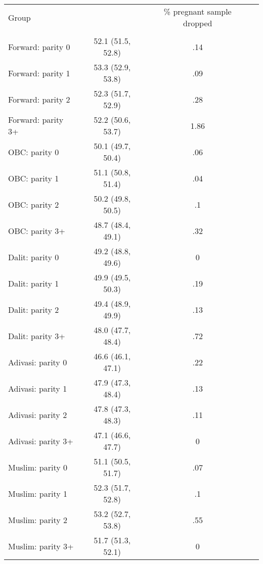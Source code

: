 \begin{tabular}{lccc}
\toprule
Group &  & \% pregnant sample dropped \\\\
\midrule
Forward: parity 0&52.1 (51.5, 52.8)&.14\\
Forward: parity 1&53.3 (52.9, 53.8)&.09\\
Forward: parity 2&52.3 (51.7, 52.9)&.28\\
Forward: parity 3+&52.2 (50.6, 53.7)&1.86\\
OBC: parity 0&50.1 (49.7, 50.4)&.06\\
OBC: parity 1&51.1 (50.8, 51.4)&.04\\
OBC: parity 2&50.2 (49.8, 50.5)&.1\\
OBC: parity 3+&48.7 (48.4, 49.1)&.32\\
Dalit: parity 0&49.2 (48.8, 49.6)&0\\
Dalit: parity 1&49.9 (49.5, 50.3)&.19\\
Dalit: parity 2&49.4 (48.9, 49.9)&.13\\
Dalit: parity 3+&48.0 (47.7, 48.4)&.72\\
Adivasi: parity 0&46.6 (46.1, 47.1)&.22\\
Adivasi: parity 1&47.9 (47.3, 48.4)&.13\\
Adivasi: parity 2&47.8 (47.3, 48.3)&.11\\
Adivasi: parity 3+&47.1 (46.6, 47.7)&0\\
Muslim: parity 0&51.1 (50.5, 51.7)&.07\\
Muslim: parity 1&52.3 (51.7, 52.8)&.1\\
Muslim: parity 2&53.2 (52.7, 53.8)&.55\\
Muslim: parity 3+&51.7 (51.3, 52.1)&0\\
\bottomrule
\end{tabular}
